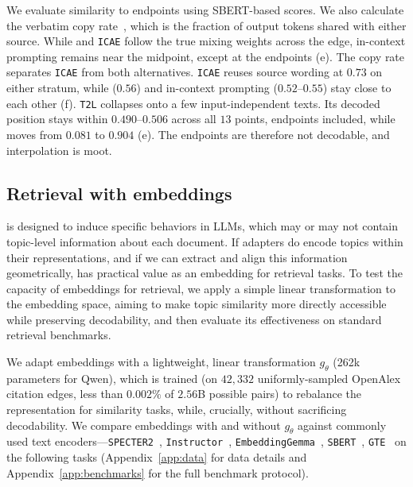 We evaluate similarity to endpoints using SBERT-based scores.
We also calculate the verbatim copy rate~\citep{grusky2018newsroom}, which is the fraction of output tokens shared with either source.
While \doctolora and \texttt{ICAE} follow the true mixing weights across the edge, in-context prompting remains near the midpoint, except at the endpoints (e).
The copy rate separates \texttt{ICAE} from both alternatives.
\texttt{ICAE} reuses source wording at $0.73$ on either stratum, while \doctolora ($0.56$) and in-context prompting ($0.52$--$0.55$) stay close to each other (f).
\texttt{T2L} collapses onto a few input-independent texts.
Its decoded position stays within $0.490$--$0.506$ across all $13$ points, endpoints included, while \doctolora moves from $0.081$ to $0.904$ (e).
The endpoints are therefore not decodable, and interpolation is moot.


\subsection{Retrieval with \doctolora embeddings}
\label{sec:similarity}

\doctolora is designed to induce specific behaviors in LLMs, which may or may not contain topic-level information about each document.
If \doctolora adapters do encode topics within their representations, and if we can extract and align this information geometrically, \doctolora has practical value as an embedding for retrieval tasks.
To test the capacity of \doctolora embeddings for retrieval, we apply a simple linear transformation to the \doctolora embedding space, aiming to make topic similarity more directly accessible while preserving decodability, and then evaluate its effectiveness on standard retrieval benchmarks.

We adapt \doctolora embeddings with a lightweight, linear transformation $g_\theta$ (262k parameters for Qwen), which is trained (on $42{,}332$ uniformly-sampled OpenAlex citation edges, less than $0.002\%$ of $2.56$B possible pairs) to rebalance the representation for similarity tasks, while, crucially, without sacrificing decodability.
We compare \doctolora embeddings with and without $g_\theta$ against commonly used text encoders---\texttt{SPECTER2}~\citep{singh2023scirepeval}, \texttt{Instructor}~\citep{su2023instructor}, \texttt{EmbeddingGemma}~\citep{embeddinggemma2025}, \texttt{SBERT}~\citep{reimers2019sbert}, \texttt{GTE}~\citep{li2023gte} on the following tasks (Appendix~\ref{app:data} for data details and Appendix~\ref{app:benchmarks} for the full benchmark protocol).

